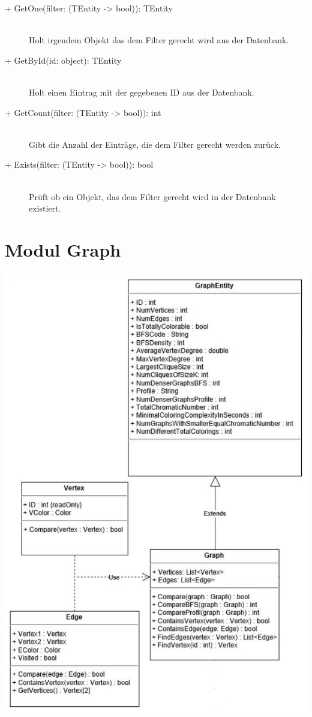 \documentclass[13pt]{scrreprt}
\begin{document}
\begin{itemize}[label = {$\circ$}]
\begin{description}
			\item [+ GetOne(filter: (TEntity -> bool)): TEntity] \hfill \\ Holt irgendein Objekt das dem Filter gerecht wird aus der Datenbank.
			\item [+ GetById(id: object): TEntity] \hfill \\ Holt einen Eintrag mit der gegebenen ID aus der Datenbank.
			\item [+ GetCount(filter: (TEntity -> bool)): int] \hfill \\ Gibt die Anzahl der Eintr\"age, die dem Filter gerecht werden zur\"uck.
			\item [+ Exists(filter: (TEntity -> bool)): bool] \hfill \\ Pr\"uft ob ein Objekt, das dem Filter gerecht wird in der Datenbank existiert.
		\end{description}
	\end{itemize}
	
	\section{Modul Graph}
	
	\includegraphics[scale=0.9, center]{GraphPackage.jpg}
	
\end{document}
